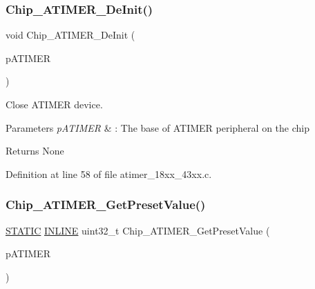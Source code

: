 \subsubsection{\texorpdfstring{Chip\+\_\+\+A\+T\+I\+M\+E\+R\+\_\+\+De\+Init()}{Chip\_ATIMER\_DeInit()}}
{\footnotesize\ttfamily void Chip\+\_\+\+A\+T\+I\+M\+E\+R\+\_\+\+De\+Init (\begin{DoxyParamCaption}\item[{\hyperlink{struct_l_p_c___a_t_i_m_e_r___t}{L\+P\+C\+\_\+\+A\+T\+I\+M\+E\+R\+\_\+T} $\ast$}]{p\+A\+T\+I\+M\+ER }\end{DoxyParamCaption})}



Close A\+T\+I\+M\+ER device. 


\begin{DoxyParams}{Parameters}
{\em p\+A\+T\+I\+M\+ER} & \+: The base of A\+T\+I\+M\+ER peripheral on the chip \\
\hline
\end{DoxyParams}
\begin{DoxyReturn}{Returns}
None 
\end{DoxyReturn}


Definition at line 58 of file atimer\+\_\+18xx\+\_\+43xx.\+c.

\mbox{\label{group___a_t_i_m_e_r__18_x_x__43_x_x_ga0bb6a4c4ff315c739c697ac023494619}} 
\subsubsection{\texorpdfstring{Chip\+\_\+\+A\+T\+I\+M\+E\+R\+\_\+\+Get\+Preset\+Value()}{Chip\_ATIMER\_GetPresetValue()}}
{\footnotesize\ttfamily \hyperlink{group___l_p_c___types___public___macros_ga10b2d890d871e1489bb02b7e70d9bdfb}{S\+T\+A\+T\+IC} \hyperlink{spifi__18xx__43xx_8h_a2eb6f9e0395b47b8d5e3eeae4fe0c116}{I\+N\+L\+I\+NE} uint32\+\_\+t Chip\+\_\+\+A\+T\+I\+M\+E\+R\+\_\+\+Get\+Preset\+Value (\begin{DoxyParamCaption}\item[{\hyperlink{struct_l_p_c___a_t_i_m_e_r___t}{L\+P\+C\+\_\+\+A\+T\+I\+M\+E\+R\+\_\+T} $\ast$}]{p\+A\+T\+I\+M\+ER }\end{DoxyParamCaption})}



